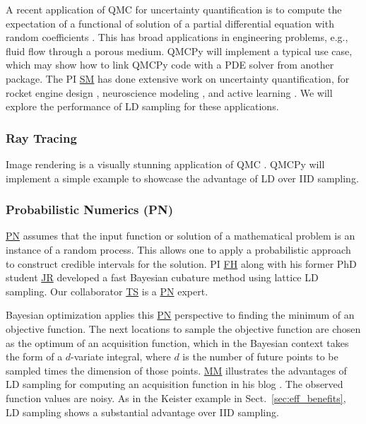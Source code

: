 \documentclass[11pt]{NSFamsart}
\newcommand{\FH}{\hyperlink{FHlink}{FH}\xspace}
\newcommand{\SM}{\hyperlink{SMlink}{SM}\xspace}
\newcommand{\MM}{\hyperlink{MMlink}{MM}\xspace}
\newcommand{\TS}{\hyperlink{TSlink}{TS}\xspace}
\newcommand{\JR}{\hyperlink{JRlink}{JR}\xspace}
\newcommand{\PN}{\hyperlink{PNlink}{PN}\xspace}
\begin{document}
A recent application of QMC for uncertainty quantification is to compute the expectation of a functional of solution of a partial differential equation with random coefficients \cite{HerSch20a}. This has broad applications in engineering problems, e.g., fluid flow through a porous medium. QMCPy will implement a typical use case, which may show how to link QMCPy code with a PDE solver from another package. The PI \SM has done extensive work on uncertainty quantification, for rocket engine design \cite{li2017two,li2018uncertainty,chang2019kernel,yeh2018common,mak2018efficient}, neuroscience modeling \cite{wang2020uncertainty}, and active learning \cite{mak2018maximum}. We will explore the performance of LD sampling for these applications.

\subsubsection{Ray Tracing}
Image rendering is a visually stunning application of QMC \cite{Keller2013a}.  QMCPy will implement a simple example to showcase the advantage of LD over IID sampling.

\subsubsection{Probabilistic Numerics (PN)}\hypertarget{PNlink}{}
\PN assumes that the input function or solution of a mathematical problem is an instance of a random process.  This allows one to apply a probabilistic approach to construct credible intervals for the solution. PI \FH along with his former PhD student \JR developed a fast Bayesian cubature method \cite{RatHic19a} using lattice LD sampling.  Our collaborator \TS is a \PN expert.

Bayesian optimization applies this \PN perspective to finding the minimum of an objective function.  The next locations to sample the objective function are chosen as the optimum of an acquisition function, which in the Bayesian context takes the form of a $d$-variate integral, where $d$ is the number of future points to be sampled times the dimension of those points.  \MM illustrates the advantages of LD sampling for computing an acquisition function in his blog \cite[qEI with QMCPy]{QMCBlog}.  The observed function values are noisy.  As in the Keister example in Sect.\ \ref{sec:eff_benefits}, LD sampling shows a substantial advantage over IID sampling.
\end{document}
